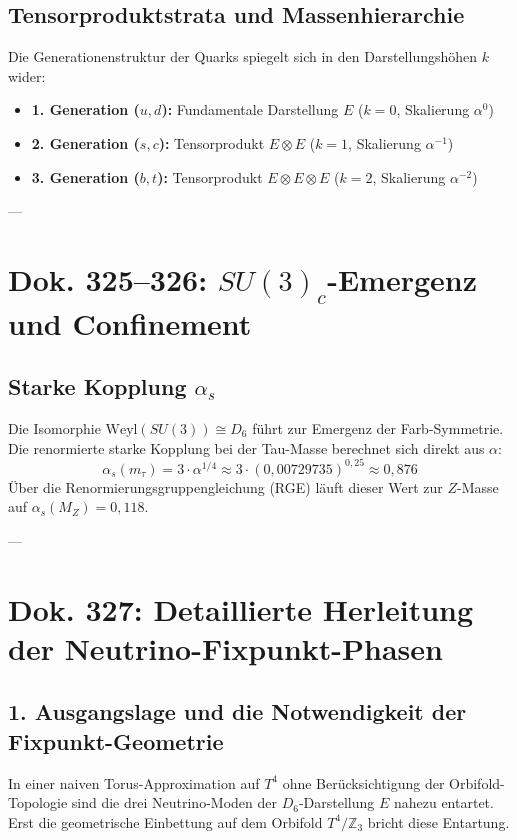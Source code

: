 \documentclass[11pt,a4paper]{article}
\begin{document}
	\subsection{Tensorproduktstrata und Massenhierarchie}
	Die Generationenstruktur der Quarks spiegelt sich in den Darstellungshöhen $k$ wider:
	\begin{itemize}
		\item \textbf{1. Generation ($u, d$):} Fundamentale Darstellung $E$ ($k=0$, Skalierung $\alpha^0$)
		\item \textbf{2. Generation ($s, c$):} Tensorprodukt $E \otimes E$ ($k=1$, Skalierung $\alpha^{-1}$)
		\item \textbf{3. Generation ($b, t$):} Tensorprodukt $E \otimes E \otimes E$ ($k=2$, Skalierung $\alpha^{-2}$)
	\end{itemize}
	
	---
	
	\section{Dok. 325--326: \texorpdfstring{$SU(3)_c$}{SU(3)\_c}-Emergenz und Confinement}
	
	\subsection{Starke Kopplung \texorpdfstring{$\alpha_s$}{alpha\_s}}
	Die Isomorphie $\text{Weyl}(SU(3)) \cong D_6$ führt zur Emergenz der Farb-Symmetrie. Die renormierte starke Kopplung bei der Tau-Masse berechnet sich direkt aus $\alpha$:
	\begin{equation}
		\alpha_s(m_\tau) = 3 \cdot \alpha^{1/4} \approx 3 \cdot (0{,}00729735)^{0{,}25} \approx 0{,}876
	\end{equation}
	Über die Renormierungsgruppengleichung (RGE) läuft dieser Wert zur $Z$-Masse auf $\alpha_s(M_Z) = 0{,}118$.
	
	---
	
	\section{Dok. 327: Detaillierte Herleitung der Neutrino-Fixpunkt-Phasen}
	
	\subsection{1. Ausgangslage und die Notwendigkeit der Fixpunkt-Geometrie}
	In einer naiven Torus-Approximation auf $T^4$ ohne Berücksichtigung der Orbifold-Topologie sind die drei Neutrino-Moden der $D_6$-Darstellung $E$ nahezu entartet. Erst die geometrische Einbettung auf dem Orbifold $T^4/\mathbb{Z}_3$ bricht diese Entartung. 
	
\end{document}
